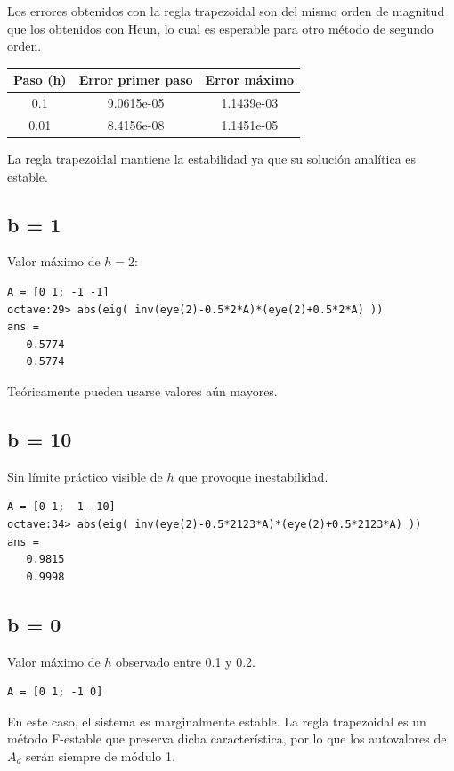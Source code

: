 \documentclass[a4paper,12pt]{article}
\begin{document}
Los errores obtenidos con la regla trapezoidal son del mismo orden de magnitud que los obtenidos con Heun, lo cual es esperable para otro método de segundo orden.

\begin{table}[H]
\centering
\begin{tabular}{@{}ccc@{}}
\toprule
Paso (h) & Error primer paso & Error máximo \\
\midrule
0.1 & 9.0615e-05 & 1.1439e-03 \\
0.01 & 8.4156e-08 & 1.1451e-05 \\
\bottomrule
\end{tabular}
\end{table}

La regla trapezoidal mantiene la estabilidad ya que su solución analítica es estable.

\subsection*{b = 1}
Valor máximo de \( h = 2 \):

\begin{verbatim}
A = [0 1; -1 -1]
octave:29> abs(eig( inv(eye(2)-0.5*2*A)*(eye(2)+0.5*2*A) ))
ans =
   0.5774
   0.5774
\end{verbatim}

Teóricamente pueden usarse valores aún mayores.

\subsection*{b = 10}
Sin límite práctico visible de \( h \) que provoque inestabilidad.

\begin{verbatim}
A = [0 1; -1 -10]
octave:34> abs(eig( inv(eye(2)-0.5*2123*A)*(eye(2)+0.5*2123*A) ))
ans =
   0.9815
   0.9998
\end{verbatim}

\subsection*{b = 0}
Valor máximo de \( h \) observado entre 0.1 y 0.2.

\begin{verbatim}
A = [0 1; -1 0]
\end{verbatim}

En este caso, el sistema es marginalmente estable. La regla trapezoidal es un método F-estable que preserva dicha característica, por lo que los autovalores de \( A_d \) serán siempre de módulo 1.
\end{document}
